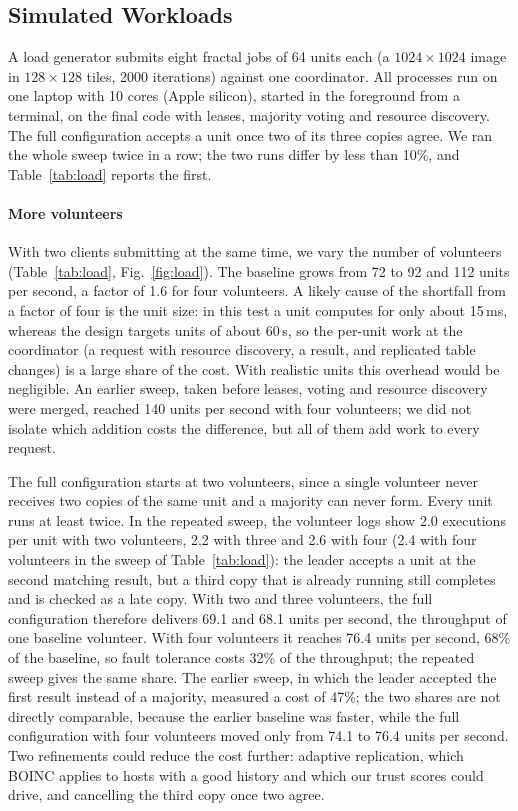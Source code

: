 \subsection{Simulated Workloads}
A load generator submits eight fractal jobs of 64 units each (a $1024\times1024$ image in $128\times128$ tiles, 2000 iterations) against one coordinator. All processes run on one laptop with 10 cores (Apple silicon), started in the foreground from a terminal, on the final code with leases, majority voting and resource discovery. The full configuration accepts a unit once two of its three copies agree. We ran the whole sweep twice in a row; the two runs differ by less than 10\%, and Table~\ref{tab:load} reports the first.

\paragraph{More volunteers}
With two clients submitting at the same time, we vary the number of volunteers (Table~\ref{tab:load}, Fig.~\ref{fig:load}). The baseline grows from 72 to 92 and 112 units per second, a factor of 1.6 for four volunteers. A likely cause of the shortfall from a factor of four is the unit size: in this test a unit computes for only about 15\,ms, whereas the design targets units of about 60\,s, so the per-unit work at the coordinator (a request with resource discovery, a result, and replicated table changes) is a large share of the cost. With realistic units this overhead would be negligible. An earlier sweep, taken before leases, voting and resource discovery were merged, reached 140 units per second with four volunteers; we did not isolate which addition costs the difference, but all of them add work to every request.

The full configuration starts at two volunteers, since a single volunteer never receives two copies of the same unit and a majority can never form. Every unit runs at least twice. In the repeated sweep, the volunteer logs show 2.0 executions per unit with two volunteers, 2.2 with three and 2.6 with four (2.4 with four volunteers in the sweep of Table~\ref{tab:load}): the leader accepts a unit at the second matching result, but a third copy that is already running still completes and is checked as a late copy. With two and three volunteers, the full configuration therefore delivers 69.1 and 68.1 units per second, the throughput of one baseline volunteer. With four volunteers it reaches 76.4 units per second, 68\% of the baseline, so fault tolerance costs 32\% of the throughput; the repeated sweep gives the same share. The earlier sweep, in which the leader accepted the first result instead of a majority, measured a cost of 47\%; the two shares are not directly comparable, because the earlier baseline was faster, while the full configuration with four volunteers moved only from 74.1 to 76.4 units per second. Two refinements could reduce the cost further: adaptive replication, which BOINC applies to hosts with a good history and which our trust scores could drive, and cancelling the third copy once two agree.

